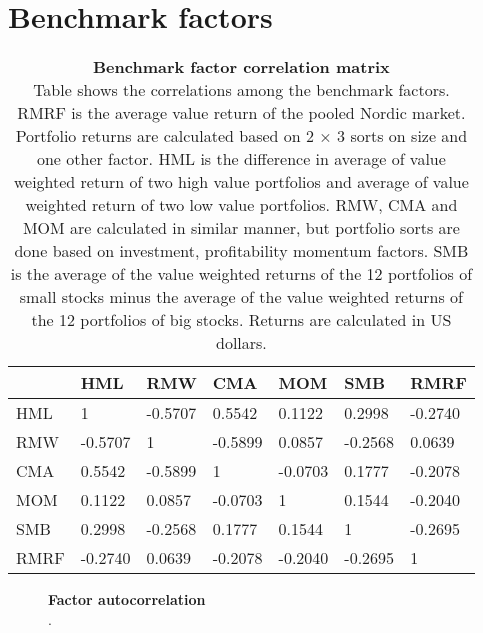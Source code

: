 \documentclass{article}
\begin{document}
\section{Benchmark factors}
\renewcommand{\thefigure}{B.\arabic{figure}}
\setcounter{figure}{0}
\renewcommand{\thetable}{B.\arabic{table}}
\setcounter{table}{0}

\begin{table}[ht]
\small
\caption[Benchmark factor correlation matrix]{\textbf{Benchmark factor correlation matrix}\\ Table shows the correlations among the benchmark factors. RMRF is the average value return of the pooled Nordic market. Portfolio returns are calculated based on 2 × 3 sorts on size and one other factor. HML is the difference in average of value weighted return of two high value portfolios and average of value weighted return of two low value portfolios. RMW, CMA and MOM are calculated in similar manner, but portfolio sorts are done based on investment, profitability momentum factors. SMB is the average of the value weighted returns of the 12 portfolios of small stocks minus the average of the value weighted returns of the 12 portfolios of big stocks. Returns are calculated in US dollars.}
\label{table:FFfactorsCorrelations}
\centering
{}
\begin{tabularx}{\textwidth}{@{\extracolsep{4pt}} X Y Y Y Y Y Y} 
\toprule
& HML & RMW & CMA & MOM & SMB & RMRF \\
\midrule
HML & 1 & -0.5707 & 0.5542 & 0.1122 & 0.2998 & -0.2740 \\
RMW & -0.5707 & 1 & -0.5899 & 0.0857 & -0.2568 & 0.0639 \\
CMA & 0.5542 & -0.5899 & 1 & -0.0703 & 0.1777 & -0.2078 \\
MOM & 0.1122 & 0.0857 & -0.0703 & 1 & 0.1544 & -0.2040 \\
SMB & 0.2998 & -0.2568 & 0.1777 & 0.1544 & 1 & -0.2695 \\
RMRF & -0.2740 & 0.0639 & -0.2078 & -0.2040 & -0.2695 & 1 \\
\bottomrule
\end{tabularx}
\end{table}

\begin{figure}[ht]
\centering
\caption[Factor autocorrelation]{\textbf{Factor autocorrelation}\\ .}

\label{plot:factor_autocorrelation}
\end{figure}
\end{document}
